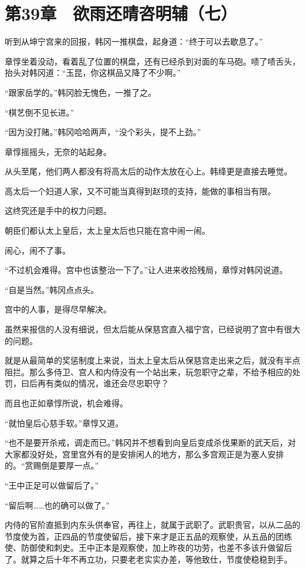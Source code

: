 \section{第39章　欲雨还晴咨明辅（七）}

听到从坤宁宫来的回报，韩冈一推棋盘，起身道：“终于可以去歇息了。”

章惇坐着没动，看着乱了位置的棋盘，还有已经杀到对面的车马砲。啧了啧舌头，抬头对韩冈道：“玉昆，你这棋品又降了不少啊。”

“跟家岳学的。”韩冈脸无愧色，一推了之。

“棋艺倒不见长进。”

“因为没打赌。”韩冈哈哈两声，“没个彩头，提不上劲。”

章惇摇摇头，无奈的站起身。

从头至尾，他们两人都没有将高太后的动作太放在心上。韩绛更是直接去睡觉。

高太后一个妇道人家，又不可能当真得到赵顼的支持，能做的事相当有限。

这终究还是手中的权力问题。

朝臣们都认太上皇后，太上皇太后也只能在宫中闹一闹。

闹心，闹不了事。

“不过机会难得。宫中也该整治一下了。”让人进来收拾残局，章惇对韩冈说道。

“自是当然。”韩冈点点头。

宫中的人事，是得尽早解决。

虽然来报信的人没有细说，但太后能从保慈宫直入福宁宫，已经说明了宫中有很大的问题。

就是从最简单的奖惩制度上来说，当太上皇太后从保慈宫走出来之后，就没有半点阻拦。那么多侍卫、宫人和内侍没有一个站出来，玩忽职守之辈，不给予相应的处罚，曰后再有类似的情况，谁还会尽忠职守？

而且也正如章惇所说，机会难得。

“就怕皇后心慈手软。”章惇又道。

“也不是要开杀戒，调走而已。”韩冈并不想看到向皇后变成杀伐果断的武天后，对大家都没好处，宫里宫外有的是安排闲人的地方，那么多宫观正是为塞人安排的。“赏赐倒是要厚一点。”

“王中正足可以做留后了。”

“留后啊……也的确可以做了。”

内侍的官阶直抵到内东头供奉官，再往上，就属于武职了。武职贵官，以从二品的节度使为首，正四品的节度使留后，接下来才是正五品的观察使，从五品的团练使、防御使和刺史。王中正本是观察使，加上昨夜的功劳，也差不多该升做留后了。就算之后十年不再立功，只要老老实实办差，等他致仕，节度使稳稳到手。


